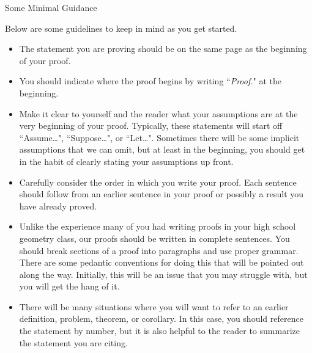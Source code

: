 \begin{section}{Some Minimal Guidance}\label{sec:guidance}

Below are some guidelines to keep in mind as you get started.

\begin{itemize}
\item The statement you are proving should be on the same page as the beginning of your proof.   
\item You should indicate where the proof begins by writing ``\emph{Proof.}" at the beginning.  
\item Make it clear to yourself and the reader what your assumptions are at the very beginning of your proof. Typically, these statements will start off ``Assume\ldots", ``Suppose\ldots", or ``Let\ldots".  Sometimes there will be some implicit assumptions that we can omit, but at least in the beginning, you should get in the habit of clearly stating your assumptions up front. 
\item Carefully consider the order in which you write your proof. Each sentence should follow from an earlier sentence in your proof or possibly a result you have already proved.
\item Unlike the experience many of you had writing proofs in your high school geometry class, our proofs should be written in complete sentences.  You should break sections of a proof into paragraphs and use proper grammar.  There are some pedantic conventions for doing this that will be pointed out along the way.  Initially, this will be an issue that you may struggle with, but you will get the hang of it.
\item There will be many situations where you will want to refer to an earlier definition, problem, theorem, or corollary.  In this case, you should reference the statement by number, but it is also helpful to the reader to summarize the statement you are citing.  

\end{itemize}
\end{section}
